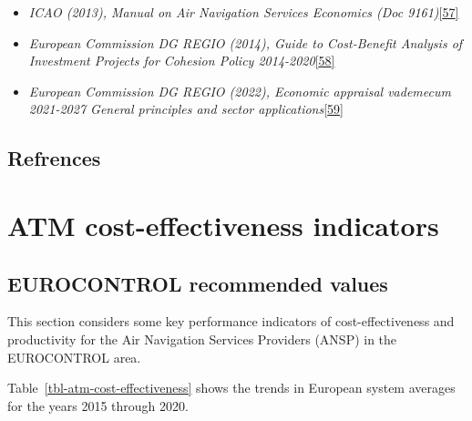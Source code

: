 \documentclass[
  11pt,
  a4paper,
]{book}
\begin{document}
\begin{itemize}
\item
  \emph{ICAO (2013), Manual on Air Navigation Services Economics (Doc
  9161)}\protect\hyperlink{ref-icao2013}{{[}57{]}}
\item
  \emph{European Commission DG REGIO (2014), Guide to Cost-Benefit
  Analysis of Investment Projects for Cohesion Policy
  2014-2020}\protect\hyperlink{ref-ecdgregio2014}{{[}58{]}}
\item
  \emph{European Commission DG REGIO (2022), Economic appraisal
  vademecum 2021-2027 General principles and sector
  applications}\protect\hyperlink{ref-ecdgregiovademecum2022}{{[}59{]}}
\end{itemize}

\hypertarget{refrences}{%
\section{Refrences}\label{refrences}}

\hypertarget{sec-atm-cost-effectiveness-indicators}{%
\chapter{ATM cost-effectiveness
indicators}\label{sec-atm-cost-effectiveness-indicators}}

\hypertarget{eurocontrol-recommended-values-28}{%
\section{EUROCONTROL recommended
values}\label{eurocontrol-recommended-values-28}}

This section considers some key performance indicators of
cost-effectiveness and productivity for the Air Navigation Services
Providers (ANSP) in the EUROCONTROL area.

Table~\ref{tbl-atm-cost-effectiveness} shows the trends in European
system averages for the years 2015 through 2020.
\end{document}
